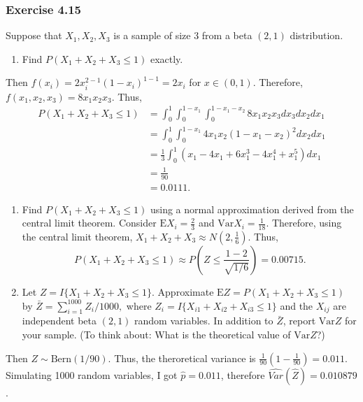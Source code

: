\documentclass[12pt,]{article}
\providecommand{\tightlist}{%
  \setlength{\itemsep}{0pt}\setlength{\parskip}{0pt}}
\begin{document}
\hypertarget{exercise-4.15}{%
\subsubsection{Exercise 4.15}\label{exercise-4.15}}

Suppose that \(X_1, X_2, X_3\) is a sample of size 3 from a beta
\((2,1)\) distribution.

\begin{enumerate}
\def\labelenumi{(\alph{enumi})}
\tightlist
\item
  Find \(P(X_1 + X_2 + X_3 \le 1)\) exactly.
\end{enumerate}

Then \(f(x_i) = 2x_i^{2-1}(1-x_i)^{1-1}=2x_i\) for \(x\in(0,1).\)
Therefore, \(f(x_1,x_2,x_3) = 8x_1x_2x_3.\) Thus, \begin{align*}
P(X_1 + X_2 + X_3 \le 1) & = \int_0^1 \int_0^{1-x_1} \int_0^{1-x_1-x_2} 8x_1x_2x_3 dx_3 dx_2 dx_1\\
& = \int_0^1 \int_0^{1-x_1} 4x_1x_2(1-x_1-x_2)^2 dx_2 dx_1\\
& = \frac{1}{3} \int_0^1 (x_1-4x_1+6x_1^3-4x_1^4+x_1^5) dx_1\\
& = \frac{1}{90}\\
& = 0.0111.
\end{align*}

\begin{enumerate}
\def\labelenumi{(\alph{enumi})}
\setcounter{enumi}{1}
\item
  Find \(P(X_1 + X_2 + X_3 \le 1)\) using a normal approximation derived
  from the central limit theorem. Consider \(\text{E}X_i = \frac{2}{3}\)
  and \(\text{Var}X_i = \frac{1}{18}.\) Therefore, using the central
  limit theorem, \(X_1 + X_2 + X_3 \approx N(2,\frac{1}{6})\). Thus,
  \[P(X_1+X_2+X_3\le 1)\approx P\left(Z\le \frac{1-2}{\sqrt{1/6}}\right)=0.00715.\]
\item
  Let \(Z = I\{X_1 + X_2 + X_3 \le 1\}\). Approximate
  \(\text{E} Z = P(X_1 + X_2 + X_3 \le 1)\) by
  \(\bar Z = \sum_{i=1}^{1000} Z_i/1000,\) where
  \(Z_i = I \{ X_{i1} + X_{i2} + X_{i3} \le 1 \}\) and the \(X_{ij}\)
  are independent beta \((2,1)\) random variables. In addition to
  \(\bar Z\), report \(\text{Var} Z\) for your sample. (To think about:
  What is the theoretical value of \(\text{Var} Z\)?)
\end{enumerate}

Then \(Z\sim\text{Bern}(1/90).\) Thus, the theroretical variance is
\(\frac{1}{90}\left(1-\frac{1}{90}\right) = 0.011.\) Simulating 1000
random variables, I got \(\hat p = 0.011\), therefore
\(\hat{Var}(\hat Z) = 0.010879\).
\end{document}
